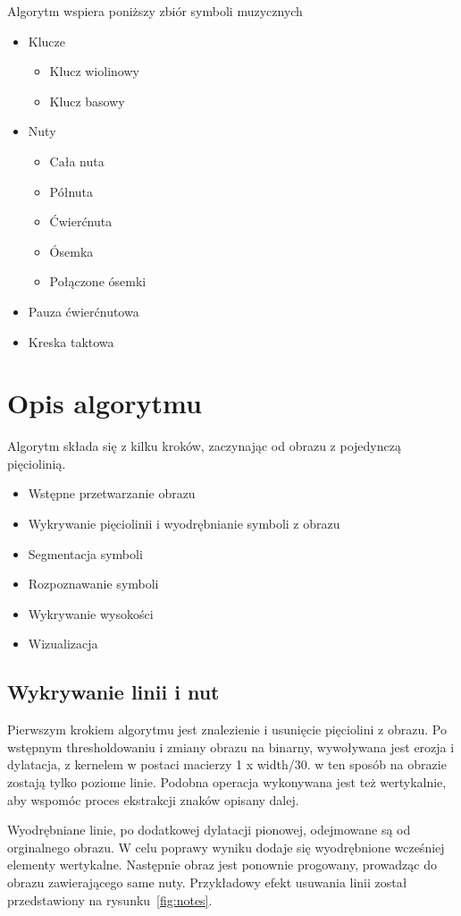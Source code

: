 \documentclass[a4paper,11pt]{article}
\begin{document}
Algorytm wspiera poniższy zbiór symboli muzycznych
\begin{itemize}
\item Klucze
  \begin{itemize}
  \item Klucz wiolinowy
  \item Klucz basowy
  \end{itemize}
\item Nuty
  \begin{itemize}
  \item Cała nuta
  \item Półnuta
  \item Ćwierćnuta
  \item Ósemka
  \item Połączone ósemki
  \end{itemize}
\item Pauza ćwierćnutowa
\item Kreska taktowa
\end{itemize}

\section{Opis algorytmu}

Algorytm składa się z kilku kroków, zaczynając od obrazu z pojedynczą pięciolinią.
\begin{itemize}
\item Wstępne przetwarzanie obrazu
\item Wykrywanie pięciolinii i wyodrębnianie symboli z obrazu
\item Segmentacja symboli
\item Rozpoznawanie symboli
\item Wykrywanie wysokości
\item Wizualizacja
\end{itemize}

\subsection{Wykrywanie linii i nut}
Pierwszym krokiem algorytmu jest znalezienie i usunięcie pięciolini z obrazu.
Po wstępnym thresholdowaniu i zmiany obrazu na binarny, wywoływana jest erozja i dylatacja, z kernelem w postaci macierzy 1 x width/30.
w ten sposób na obrazie zostają tylko poziome linie.
Podobna operacja wykonywana jest też wertykalnie, aby wspomóc proces ekstrakcji znaków opisany dalej.

Wyodrębniane linie, po dodatkowej dylatacji pionowej, odejmowane są od orginalnego obrazu.
W celu poprawy wyniku dodaje się wyodrębnione wcześniej elementy wertykalne.
Następnie obraz jest ponownie progowany, prowadząc do obrazu zawierającego same nuty. Przykładowy efekt usuwania linii został przedstawiony na rysunku~\ref{fig:notes}.
\end{document}
